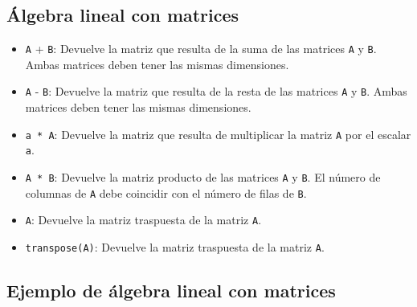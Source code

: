 \documentclass[
  letterpaper,
  DIV=11,
  numbers=noendperiod]{scrreprt}
\providecommand{\tightlist}{%
  \setlength{\itemsep}{0pt}\setlength{\parskip}{0pt}}\usepackage{longtable,booktabs,array}
\begin{document}
\hypertarget{uxe1lgebra-lineal-con-matrices}{%
\subsection{Álgebra lineal con
matrices}\label{uxe1lgebra-lineal-con-matrices}}

\begin{itemize}
\tightlist
\item
  \texttt{A} + \texttt{B}: Devuelve la matriz que resulta de la suma de
  las matrices \texttt{A} y \texttt{B}. Ambas matrices deben tener las
  mismas dimensiones.
\item
  \texttt{A} - \texttt{B}: Devuelve la matriz que resulta de la resta de
  las matrices \texttt{A} y \texttt{B}. Ambas matrices deben tener las
  mismas dimensiones.
\item
  \texttt{a\ *\ A}: Devuelve la matriz que resulta de multiplicar la
  matriz \texttt{A} por el escalar \texttt{a}.
\item
  \texttt{A\ *\ B}: Devuelve la matriz producto de las matrices
  \texttt{A} y \texttt{B}. El número de columnas de \texttt{A} debe
  coincidir con el número de filas de \texttt{B}.
\item
  \texttt{A\textquotesingle{}}: Devuelve la matriz traspuesta de la
  matriz \texttt{A}.
\item
  \texttt{transpose(A)}: Devuelve la matriz traspuesta de la matriz
  \texttt{A}.
\end{itemize}

\hypertarget{ejemplo-de-uxe1lgebra-lineal-con-matrices}{%
\subsection{Ejemplo de álgebra lineal con
matrices}\label{ejemplo-de-uxe1lgebra-lineal-con-matrices}}
\end{document}
